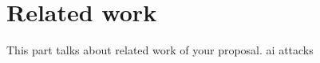 \section{Related work}\label{relatedworks}
This part talks about related work of your proposal.
 \gls{ai} attacks \cite{aiLow}